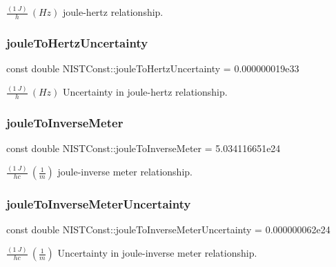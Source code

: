 $\frac{(1\ J)}{h} \ (Hz)$ joule-\/hertz relationship. \mbox{\label{group___joule_ga059f125fb7eede11c5b14b45349fe18e}} 
\subsubsection{\texorpdfstring{joule\+To\+Hertz\+Uncertainty}{jouleToHertzUncertainty}}
{\footnotesize\ttfamily const double N\+I\+S\+T\+Const\+::joule\+To\+Hertz\+Uncertainty = 0.\+000000019e33}

$\frac{(1\ J)}{h} \ (Hz)$ Uncertainty in joule-\/hertz relationship. \mbox{\label{group___joule_gaa8de9ad07a642c1b9c1d4ee15125a917}} 
\subsubsection{\texorpdfstring{joule\+To\+Inverse\+Meter}{jouleToInverseMeter}}
{\footnotesize\ttfamily const double N\+I\+S\+T\+Const\+::joule\+To\+Inverse\+Meter = 5.\+034116651e24}

$\frac{(1\ J)}{hc} \ (\frac{1}{m})$ joule-\/inverse meter relationship. \mbox{\label{group___joule_gaed9939434cab903ad8dbc9d4da1d5e0c}} 
\subsubsection{\texorpdfstring{joule\+To\+Inverse\+Meter\+Uncertainty}{jouleToInverseMeterUncertainty}}
{\footnotesize\ttfamily const double N\+I\+S\+T\+Const\+::joule\+To\+Inverse\+Meter\+Uncertainty = 0.\+000000062e24}

$\frac{(1\ J)}{hc} \ (\frac{1}{m})$ Uncertainty in joule-\/inverse meter relationship. \mbox{\label{group___joule_ga506f23a4b88678bd7ee6f1067e97aa83}} 
